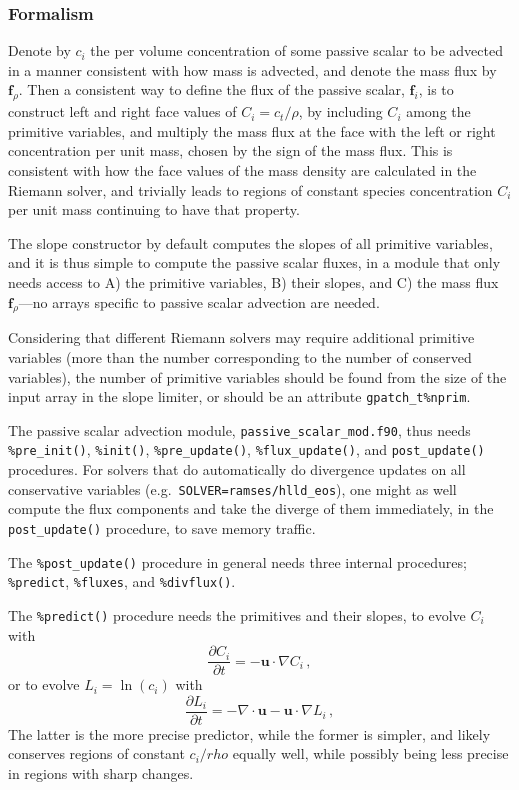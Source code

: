 \documentclass[paper=a4,fontsize=11pt]{scrartcl}
\numberwithin{equation}{section}		%
\numberwithin{figure}{section}			%
\numberwithin{table}{section}				%
\newcommand{\codecolor}{\color{Blue}}
\newcommand{\Code}[1]{{\codecolor\texttt{#1}}}
\begin{document}
\subsubsection{Formalism}
Denote by $c_i$ the per volume concentration of some passive scalar to be advected in a manner consistent with how mass is advected, and denote the mass flux by $\mathbf{f}_{\rho}$.  Then a consistent way to define the flux of the passive scalar, $\mathbf{f}_i$, is to construct left and right face values of $C_i = c_t/\rho$, by including $C_i$ among the primitive variables, and multiply the mass flux at the face with the left or right concentration per unit mass, chosen by the sign of the mass flux.  This is consistent with how the face values of the mass density are calculated in the Riemann solver, and trivially leads to regions of constant species concentration $C_i$ per unit mass continuing to have that property.

The slope constructor by default computes the slopes of all primitive variables, and it is thus simple to compute the passive scalar fluxes, in a module that only needs access to A) the primitive variables, B) their slopes, and C) the mass flux $\mathbf{f}_{\rho}$---no arrays specific to passive scalar advection are needed.

Considering that different Riemann solvers may require additional primitive variables (more than the number corresponding to the number of conserved variables), the number of primitive variables should be found from the size of the input array in the slope limiter, or should be an attribute \verb|gpatch_t%nprim|.

The passive scalar advection module, \Code{passive\_scalar\_mod.f90}, thus needs \verb|%pre_init()|, \verb|%init()|, \verb|%pre_update()|, \verb|%flux_update()|, and \verb|post_update()| procedures.  For solvers that do automatically do divergence updates on all conservative variables (e.g.\ \verb|SOLVER=ramses/hlld_eos|), one might as well compute the flux components and take the diverge of them immediately, in the \verb|post_update()| procedure, to save memory traffic.

The \verb|%post_update()| procedure in general needs three internal procedures; \verb|%predict|, \verb|%fluxes|, and \verb|%divflux()|.

The \verb|%predict()| procedure needs the primitives and their slopes, to evolve $C_i$ with
\begin{equation}
    \frac{\partial C_i}{\partial t} = - \mathbf{u}\cdot\nabla C_i \,,
\end{equation}
or to evolve $L_i = \ln(c_i)$ with
\begin{equation}
    \frac{\partial L_i}{\partial t} = - 
    \nabla\cdot \mathbf{u} -\mathbf{u}\cdot\nabla L_i \,,
\end{equation}
The latter is the more precise predictor, while the former is simpler, and likely conserves regions of constant $c_i/rho$ equally well, while possibly being less precise in regions with sharp changes.
\end{document}
